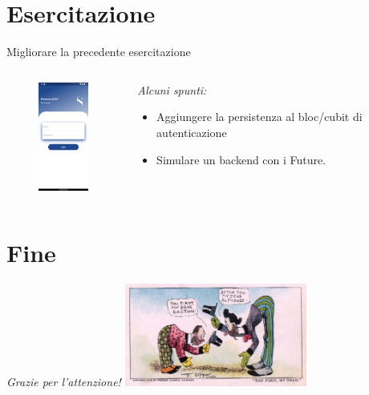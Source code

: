 \documentclass{../libs/presentation_format}
\begin{document}

\section{Esercitazione}
\begin{frame}{Migliorare la precedente esercitazione}
	\begin{minipage}[0.2\textheight]{\textwidth}
		\begin{columns}[T]
			\begin{column}{0.4\textwidth}
				\begin{figure}[htpb]
					\centering
					\includegraphics[width=2cm]{../libs/login-page}
				\end{figure}
			\end{column}
			\begin{column}{0.6\textwidth}
				\emph{Alcuni spunti:}
				\begin{itemize}
					\item Aggiungere la persistenza al bloc/cubit di autenticazione
					\item Simulare un backend con i Future.
				\end{itemize}
			\end{column}
		\end{columns}
	\end{minipage}
\end{frame}



\section{Fine}
\begin{frame}{}
	\huge\emph{Grazie per l'attenzione!}
	\newline
	\vfill
	\hfill\includegraphics[width=6cm]{../libs/alphonse-gaston-regards}
\end{frame}
\end{document}
